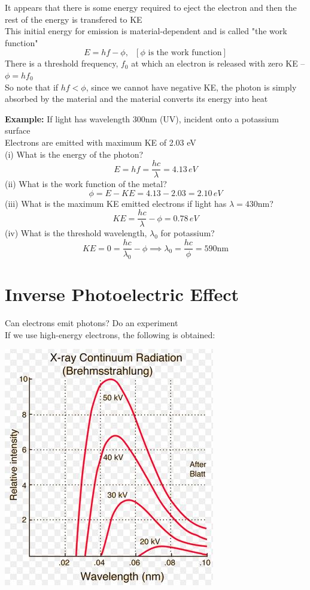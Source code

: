 \documentclass[a4paper, 11pt, fleqn, normalem]{report}
\begin{document}
It appears that there is some energy required to eject the electron and then the rest of the energy is transfered to KE \\
This initial energy for emission is material-dependent and is called "the work function"
\begin{equation*}
    E = hf - \phi,~~~[\phi\text{ is the work function}]
\end{equation*}
There is a threshold frequency, $f_{0}$ at which an electron is released with zero KE -- $\phi = hf_{0}$ \\
So note that if $hf < \phi$, since we cannot have negative KE, the photon is simply absorbed by the material and the material converts its energy into heat

\textbf{Example: }If light has wavelength 300nm (UV), incident onto a potassium surface \\
Electrons are emitted with maximum KE of 2.03 eV \\
(i) What is the energy of the photon?
\begin{equation*}
    E = hf = \frac{hc}{\lambda} = 4.13\,eV
\end{equation*}
(ii) What is the work function of the metal?
\begin{equation*}
    \phi = E - KE = 4.13 - 2.03 = 2.10\,eV
\end{equation*}
(iii) What is the maximum KE emitted electrons if light has $\lambda = 430$nm?
\begin{equation*}
    KE = \frac{hc}{\lambda} - \phi = 0.78\,eV
\end{equation*}
(iv) What is the threshold wavelength, $\lambda_{0}$ for potassium?
\begin{equation*}
    KE = 0 = \frac{hc}{\lambda_{0}} - \phi \implies \lambda_{0} = \frac{hc}{\phi} = 590\text{nm}
\end{equation*}

\section{Inverse Photoelectric Effect}
Can electrons emit photons? Do an experiment \\
If we use high-energy electrons, the following is obtained:

\includegraphics{Bremstrah.jpg}
\end{document}
